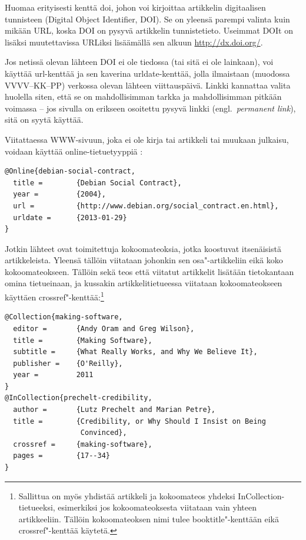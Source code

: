 \documentclass[utf8]{gradu3}
\begin{document}
Huomaa erityisesti kenttä doi, johon voi kirjoittaa artikkelin
digitaalisen tunnisteen (Digital Object Identifier, DOI).  Se on
yleensä parempi valinta kuin mikään URL, koska DOI on pysyvä
artikkelin tunnistetieto.  Useimmat DOIt on lisäksi muutettavissa
URLiksi lisäämällä sen alkuun \url{http://dx.doi.org/}.

Jos netissä olevan lähteen DOI ei ole tiedossa (tai sitä ei ole
lainkaan), voi käyttää url-kenttää ja sen kaverina urldate-kenttää,
jolla ilmaistaan (muodossa VVVV--KK--PP) verkossa olevan lähteen
viittauspäivä.  Linkki kannattaa valita huolella siten, että se on
mahdollisimman tarkka ja mahdollisimman pitkään voimassa -- jos
sivulla on erikseen osoitettu pysyvä linkki (engl.~\emph{permanent
  link}), sitä on syytä käyttää.

Viitattaessa WWW-sivuun, joka ei ole kirja tai artikkeli tai muukaan
julkaisu, voidaan käyttää
online-tietuetyyppiä \parencite[esim.][]{debian-social-contract}:

\begingroup\footnotesize
\begin{verbatim}
@Online{debian-social-contract,
  title =        {Debian Social Contract},
  year =         {2004},
  url =          {http://www.debian.org/social_contract.en.html},
  urldate =      {2013-01-29}
}
\end{verbatim}
\endgroup

Jotkin lähteet ovat toimitettuja kokoomateoksia, jotka koostuvat
itsenäisistä artikkeleista.  Yleensä tällöin viitataan johonkin sen
osa"-artikkeliin \parencite[esim.][]{prechelt-credibility} eikä koko
kokoomateokseen.  Tällöin sekä teos että viitatut artikkelit lisätään
tietokantaan omina tietueinaan, ja kussakin artikkelitietueessa
viitataan kokoomateokseen käyttäen
crossref"-kenttää:\footnote{Sallittua on myös yhdistää artikkeli ja
  kokoomateos yhdeksi InCollection-tietueeksi, esimerkiksi jos
  kokoomateoksesta viitataan vain yhteen artikkeeliin.  Tällöin
  kokoomateoksen nimi tulee booktitle"-kenttään eikä crossref"-kenttää
  käytetä.}

\begingroup\footnotesize
\begin{verbatim}
@Collection{making-software,
  editor =       {Andy Oram and Greg Wilson},
  title =        {Making Software},
  subtitle =     {What Really Works, and Why We Believe It},
  publisher =    {O'Reilly},
  year =         2011
}
@InCollection{prechelt-credibility,
  author =       {Lutz Prechelt and Marian Petre},
  title =        {Credibility, or Why Should I Insist on Being
                  Convinced},
  crossref =     {making-software},
  pages =        {17--34}
}
\end{verbatim}
\endgroup
\end{document}
